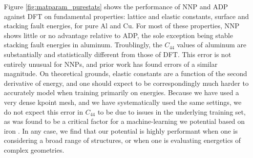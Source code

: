 \documentclass{article}
\begin{document}
Figure \ref{fig:matparam_purestats} shows the performance of NNP and ADP against DFT on fundamental properties: lattice and elastic constants, surface and stacking fault energies, for pure Al and Cu.
For most of these properties, NNP shows little or no advantage relative to ADP, the sole exception being stable stacking fault energies in aluminum.
Troublingly, the $C_{44}$ values of aluminum are substantially and statistically different from those of DFT.
This error is not entirely unusual for NNPs, and prior work has found errors of a similar magnitude\cite{Zuo2020APotentials}.
On theoretical grounds, elastic constants are a function of the second derivative of energy, and one should expect to be correspondingly much harder to accurately model when training primarily on energies.
Because we have used a very dense kpoint mesh, and we have systematically used the same settings, we do not expect this error in $C_{44}$ to be due to issues in the underlying training set, as was found to be a critical factor for a machine-learning we potential based on iron \cite{Dragoni2018AchievingIron}.  
In any case, we find that our potential is highly performant when one is considering a broad range of structures, or when one is evaluating energetics of complex geometries. 
\end{document}
